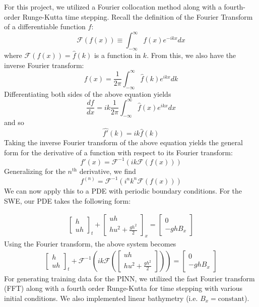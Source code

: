 For this project, we utilized a Fourier collocation method along with a fourth-order Runge-Kutta time stepping. 
Recall the definition of the Fourier Transform of a differentiable function $f$:
\[\mathcal{F}(f(x)) \equiv \int_{-\infty}^{\infty}f(x)e^{-ikx}dx\]
where $\mathcal{F}(f(x)) = \hat{f}(k)$ is a function in $k$. From this, we also have the inverse Fourier transform:
\[f(x) = \frac{1}{2\pi}\int_{-\infty}^{\infty} \hat{f}(k)e^{ikx}dk\]
Differentiating both sides of the above equation yields
\[\frac{df}{dx} = ik\frac{1}{2\pi}\int_{-\infty}^{\infty}\hat{f}(x)e^{ikx}dx\]
and so
\[\hat{f'}(k) = ik\hat{f}(k)\]
Taking the inverse Fourier transform of the above equation yields the general form for the derivative of a function with respect to its Fourier transform:
\[f'(x) = \mathcal{F}^{-1}(ik\mathcal{F}(f(x)))\]
Generalizing for the $n^{\text{th}}$ derivative, we find
\[f^{(n)} = \mathcal{F}^{-1}(i^nk^n\mathcal{F}(f(x)))\]
We can now apply this to a PDE with periodic boundary conditions. For the SWE, our PDE takes the following form:

\begin{align*}
    \begin{bmatrix}
        h\\
        uh
    \end{bmatrix}_t
    + 
    \begin{bmatrix}
        uh\\
        hu^2 + \frac{gh^2}{2}
    \end{bmatrix}_x
    =
    \begin{bmatrix}
        0\\
        -ghB_x
    \end{bmatrix}
\end{align*}    
Using the Fourier transform, the above system becomes
\begin{align*}
    \begin{bmatrix}
        h\\
        uh
    \end{bmatrix}_t
    + 
    \mathcal{F}^{-1}\left(ik\mathcal{F}\left(\begin{bmatrix}
        uh\\
        hu^2 + \frac{gh^2}{2}
    \end{bmatrix} \right)\right)
    = 
    \begin{bmatrix}
        0\\
        -ghB_x
    \end{bmatrix}
\end{align*}
For generating training data for the PINN, we utilized the fast Fourier transform (FFT) along with a fourth order Runge-Kutta for time stepping with various initial conditions. We also implemented linear bathymetry (i.e. $B_x = \text{constant}$).
\newline\newline

